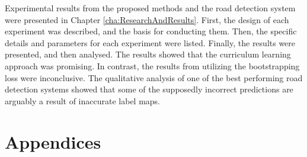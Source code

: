 \documentclass[a4paper]{book}
\begin{document}
Experimental results from the proposed methods and the road detection system were presented in Chapter \ref{cha:ResearchAndResults}. First, the design of each experiment was described, and the basis for conducting them. Then, the specific details and parameters for each experiment were listed. Finally, the results were presented, and then analysed. The results showed that the curriculum learning approach was promising. In contrast, the results from utilizing the bootstrapping loss were inconclusive. The qualitative analysis of one of the best performing road detection systems showed that some of the supposedly incorrect predictions are arguably a result of inaccurate label maps.\\







\backmatter


\appendix
\chapter*{Appendices}
\renewcommand{\thesection}{\Alph{section}}




\end{document}
